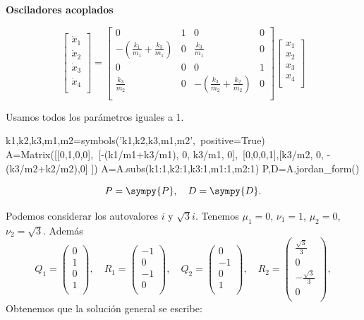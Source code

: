 \begin{ejemplo}{} \textbf{Osciladores acoplados}
 
$$
\begin{bmatrix}
\dot{x}_1\\
\dot{x}_2\\
\dot{x}_3\\
\dot{x}_4\\
\end{bmatrix}
=
\begin{bmatrix}
 0 & 1 & 0 & 0\\
 -(\frac{k_1}{m_1}+\frac{k_3}{m_1}) & 0 & \frac{k_3}{m_1} & 0\\
 0&0&0&1\\
  \frac{k_3}{m_2} & 0 &  -(\frac{k_3}{m_2}+\frac{k_2}{m_2}) & 0\\
\end{bmatrix}
\begin{bmatrix}
{x}_1\\
{x}_2\\
{x}_3\\
{x}_4\\
\end{bmatrix}
$$ 
 
Usamos todos los parámetros iguales a 1.
\begin{sympyblock}[][numbers=left,frame=single,framesep=5mm]
k1,k2,k3,m1,m2=symbols('k1,k2,k3,m1,m2',\
    positive=True)
A=Matrix([[0,1,0,0],\
          [-(k1/m1+k3/m1), 0, k3/m1, 0],\
          [0,0,0,1],[k3/m2, 0, -(k3/m2+k2/m2),0] ])
A=A.subs({k1:1,k2:1,k3:1,m1:1,m2:1})
P,D=A.jordan_form()
\end{sympyblock}
 
 $$P=\sympy{P},\quad D=\sympy{D}.$$
 
 Podemos considerar los autovalores $i$ y $\sqrt{3}i$. Tenemos $\mu_1=0$, $\nu_1=1$, $\mu_2=0$, $\nu_2=\sqrt{3}$. Además
$$
Q_1=\begin{pmatrix}
        0\\
        1  \\
        0\\
        1\\
   \end{pmatrix},\quad
R_1=\begin{pmatrix}
        -1\\
        0 \\
        -1\\
        0\\
   \end{pmatrix},\quad
Q_2=\begin{pmatrix}
        0\\
        -1  \\
        0\\
        1\\
   \end{pmatrix},\quad
R_2=\begin{pmatrix}
        \frac{\sqrt{3}}{3}\\
        0 \\
        -\frac{\sqrt{3}}{3}\\
        0\\
   \end{pmatrix},
$$ 
 Obtenemos que la solución general se escribe:


\end{ejemplo}
